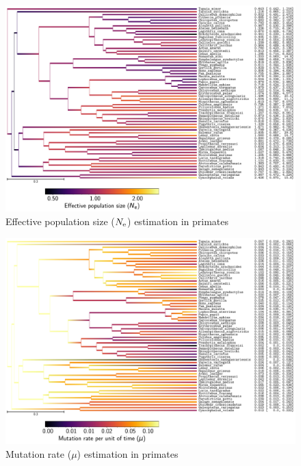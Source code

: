\documentclass{article}
\begin{document}
	\begin{figure}[H]
		\centering
		\includegraphics[width=\linewidth, page=1]{primates/SiteMutSelBranchNe_LogPopulationSize}
		\caption[$\Ne$ estimation in primates]{Effective population size ($\Ne$) estimation in primates}
	\end{figure}

	\begin{figure}[H]
		\centering
		\includegraphics[width=\linewidth, page=1]{primates/SiteMutSelBranchNe_LogMutationRatePerTime}
		\caption[Mutation rate estimation in primates]{Mutation rate ($\mu$) estimation in primates}
	\end{figure}
\end{document}
